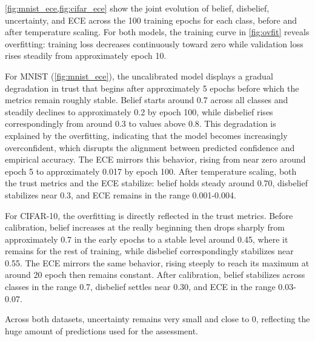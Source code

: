 \cref{fig:mnist_ece,fig:cifar_ece} show the joint evolution of belief, disbelief, uncertainty, and \ac{ECE} across the 100 training epochs for each class, before and after temperature scaling. For both models, the training curve in \cref{fig:ovfit} reveals overfitting: training loss decreases continuously toward zero while validation loss rises steadily from approximately epoch 10. 

For MNIST (\cref{fig:mnist_ece}), the uncalibrated model displays a gradual degradation in trust that begins after approximately 5 epochs before which the metrics remain roughly stable. Belief starts around 0.7 across all classes and steadily declines to approximately 0.2 by epoch 100, while disbelief rises correspondingly from around 0.3 to values above 0.8. This degradation is explained by the overfitting, indicating that the model becomes increasingly overconfident, which disrupts the alignment between predicted confidence and empirical accuracy. The \ac{ECE} mirrors this behavior, rising from near zero around epoch 5 to approximately 0.017 by epoch 100. After temperature scaling, both the trust metrics and the \ac{ECE} stabilize: belief holds steady around 0.70, disbelief stabilizes near 0.3, and \ac{ECE} remains in the range 0.001-0.004.

For CIFAR-10, the overfitting is directly reflected in the trust metrics. Before calibration, belief increases at the really beginning then drops sharply from approximately 0.7 in the early epochs to a stable level around 0.45, where it remains for the rest of training, while disbelief correspondingly stabilizes near 0.55. The \ac{ECE} mirrors the same behavior, rising steeply to reach its maximum at around 20 epoch then remains constant. After calibration, belief stabilizes across classes in the range 0.7, disbelief settles near 0.30, and \ac{ECE} in the range 0.03-0.07. 

Across both datasets, uncertainty remains very small and close to 0, reflecting the huge amount of predictions used for the assessment. 

